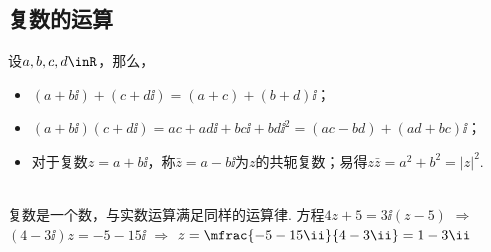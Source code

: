  \subsection{复数的运算}
    设$a,b,c,d\inR$，那么，
    \begin{itemize}
      \item $(a+b\ii)+(c+d\ii)=(a+c)+(b+d)\ii$；
      \item $(a+b\ii)(c+d\ii)=ac+ad\ii+bc\ii+bd\ii^2=(ac-bd)+(ad+bc)\ii$；
      \item 对于复数$z=a+b\ii$，称$\bar{z}=a-b\ii$为$z$的共轭复数；易得$z \bar{z}=a^2+b^2=|z|^2$.
    \end{itemize}
    \\
    {\FCom 复数是一个数，与实数运算满足同样的运算律. 方程$4z+5=3\ii(z-5)$ $\Longrightarrow$ $(4-3\ii)z=-5-15\ii$ $\Longrightarrow$ $z=\mfrac{-5-15\ii}{4-3\ii}=1-3\ii$}
